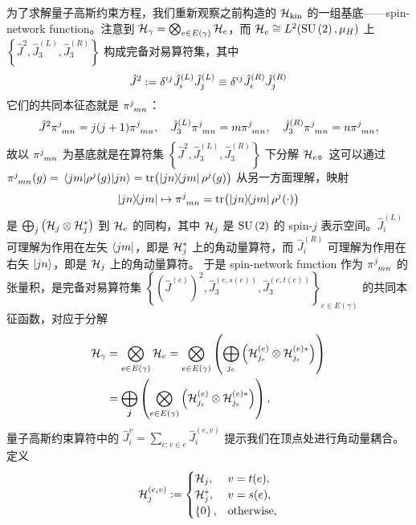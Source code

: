 		为了求解量子高斯约束方程，我们重新观察之前构造的 $\mathcal{H}_{\text{kin}}$ 的一组基底——spin-network function。注意到 $\mathcal{H}_\gamma = \bigotimes_{e\in E(\gamma)} \mathcal{H}_e$，而 $\mathcal{H}_e \cong L^2(\mathrm{SU}\left(2\right),\mu_H)$ 上 $\left\{ \hat{J}^2, \hat{J}^{(L)}_3, \hat{J}^{(R)}_3 \right\}$ 构成完备对易算符集，其中
		\begin{equation}
			\hat{J}^2 \definedby \tensor{\delta}{^i^j} \hat{J}^{(L)}_i \hat{J}^{(L)}_j \equiv \tensor{\delta}{^i^j} \hat{J}^{(R)}_i \hat{J}^{(R)}_j
		\end{equation}
		它们的共同本征态就是 $\tensor{\pi}{^j_m_n}$：
		\begin{equation}
			\hat{J}^2 \tensor{\pi}{^j_m_n} = j(j+1) \tensor{\pi}{^j_m_n} \qc \hat{J}^{(L)}_3 \tensor{\pi}{^j_m_n} = m \tensor{\pi}{^j_m_n} \qc \hat{J}^{(R)}_3 \tensor{\pi}{^j_m_n} = n \tensor{\pi}{^j_m_n},
		\end{equation}
		故以 $\tensor{\pi}{^j_m_n}$ 为基底就是在算符集 $\left\{ \hat{J}^2, \hat{J}^{(L)}_3, \hat{J}^{(R)}_3 \right\}$ 下分解 $\mathcal{H}_e$。这可以通过 $\tensor{\pi}{^j_m_n}(g) = \mel{jm}{\rho^j(g)}{jn} = \tr(\op{jn}{jm}\rho^j(g))$ 从另一方面理解，映射
		\begin{equation}
			\op{jn}{jm} \mapsto \tensor{\pi}{^j_m_n} = \tr(\op{jn}{jm}\rho^j(\cdot))
		\end{equation}
		是 $\bigoplus_j \left( \mathcal{H}_j \otimes \mathcal{H}_j^* \right)$ 到 $\mathcal{H}_e$ 的同构，其中 $\mathcal{H}_j$ 是 $\mathrm{SU}\left(2\right)$ 的 spin-$j$ 表示空间。$\hat{J}^{(L)}_i$ 可理解为作用在左矢 $\bra{jm}$，即是 $\mathcal{H}_j^*$ 上的角动量算符，而 $\hat{J}^{(R)}_i$ 可理解为作用在右矢 $\ket{jn}$，即是 $\mathcal{H}_j$ 上的角动量算符。
		于是 spin-network function 作为 $\tensor{\pi}{^j_m_n}$ 的张量积，是完备对易算符集 $\left\{ \left( \hat{J}^{(e)} \right)^2, \hat{J}^{(e,s(e))}_3, \hat{J}^{(e,t(e))}_3 \right\}_{e\in E(\gamma)}$ 的共同本征函数，对应于分解
		\begin{equation}
			\begin{split}
				\mathcal{H}_\gamma &= \bigotimes_{e\in E(\gamma)} \mathcal{H}_e = \bigotimes_{e\in E(\gamma)} \left( \bigoplus_{j_e} \left( \mathcal{H}^{(e)}_{j_e} \otimes \mathcal{H}^{(e)*}_{j_e} \right) \right)\\
				&= \bigoplus_{\vb*{j}} \left( \bigotimes_{e\in E(\gamma)} \left( \mathcal{H}^{(e)}_{j_e} \otimes \mathcal{H}^{(e)*}_{j_e} \right) \right),\label{eq-spin_network_function_decompose}
			\end{split}
		\end{equation}
		量子高斯约束算符中的 $\hat{J}^v_i = \sum_{e:v\in e} \hat{J}^{(e,v)}_i$ 提示我们在顶点处进行角动量耦合。定义
		\begin{equation}
			\mathcal{H}_j^{(e,v)} :=
			\begin{cases}
				\mathcal{H}_j, & v=t(e),\\
				\mathcal{H}_j^*, & v=s(e),\\
				\left\{ 0 \right\}, & \text{otherwise},
			\end{cases}
		\end{equation}
